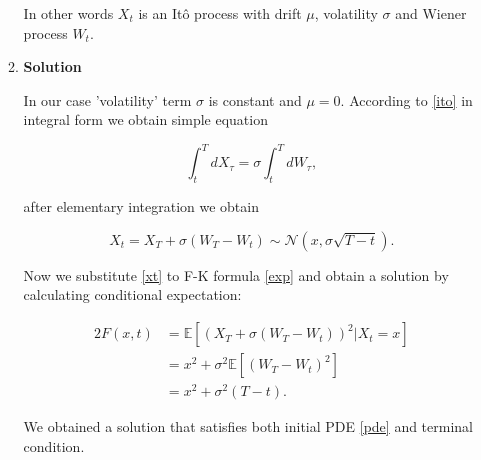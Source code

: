 \documentclass[12pt]{article}
\begin{document}
\begin{enumerate}[leftmargin=\labelsep]
\begin{enumerate}
        In other words $X_t$ is an Itô process with drift $\mu$, volatility $\sigma$ and Wiener process $W_t$.
    
    \item \textbf{Solution} 
        
        In our case 'volatility' term $\sigma$ is constant and $\mu = 0$. According to \eqref{ito} in integral form we obtain simple equation
        
        \begin{equation}
            \int_t^T dX_{\tau} = \sigma \int_t^T dW_{\tau},
        \end{equation}
        
        after elementary integration we obtain
        
        \begin{equation}\label{xt}
            X_t
            = X_T + \sigma (W_T - W_t) 
            \sim \mathcal{N} \left( x, \sigma \sqrt{T-t} \right) .
        \end{equation}
        
        Now we substitute \eqref{xt} to F-K formula \eqref{exp} and obtain a solution by calculating conditional expectation:
        
        \begin{alignat}{2}
        F(x,t) &  = \mathbb{E} \left[ \left( X_T + \sigma (W_T - W_t)  \right)^2 | X_t = x\right]  \\[6pt]
        & = x^2 + \sigma ^2 \mathbb{E} \left[  (W_T - W_t)^2 \right]
        \\[6pt]
        &= x^2 + \sigma ^2 (T - t).
        \end{alignat}
        
        We obtained a solution that satisfies both initial PDE \eqref{pde} and terminal condition.

    \end{enumerate}
\end{enumerate}
\end{document}
